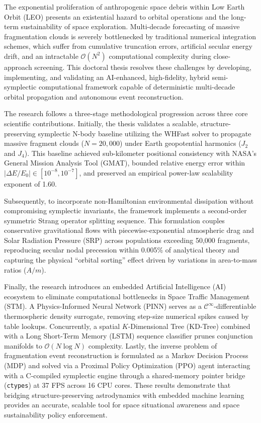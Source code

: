 \documentclass[12pt,letterpaper,twoside]{book}
\begin{document}
The exponential proliferation of anthropogenic space debris within Low Earth Orbit (LEO) presents an existential hazard to orbital operations and the long-term sustainability of space exploration. Multi-decade forecasting of massive fragmentation clouds is severely bottlenecked by traditional numerical integration schemes, which suffer from cumulative truncation errors, artificial secular energy drift, and an intractable $\mathcal{O}(N^2)$ computational complexity during close-approach screening. This doctoral thesis resolves these challenges by developing, implementing, and validating an AI-enhanced, high-fidelity, hybrid semi-symplectic computational framework capable of deterministic multi-decade orbital propagation and autonomous event reconstruction.

The research follows a three-stage methodological progression across three core scientific contributions. Initially, the thesis validates a scalable, structure-preserving symplectic N-body baseline utilizing the WHFast solver to propagate massive fragment clouds ($N = 20,000$) under Earth geopotential harmonics ($J_2$ and $J_4$). This baseline achieved sub-kilometer positional consistency with NASA's General Mission Analysis Tool (GMAT), bounded relative energy error within $|\Delta E/E_0| \in [10^{-8}, 10^{-7}]$, and preserved an empirical power-law scalability exponent of 1.60. 

Subsequently, to incorporate non-Hamiltonian environmental dissipation without compromising symplectic invariants, the framework implements a second-order symmetric Strang operator splitting sequence. This formulation couples conservative gravitational flows with piecewise-exponential atmospheric drag and Solar Radiation Pressure (SRP) across populations exceeding 50,000 fragments, reproducing secular nodal precession within 0.005\% of analytical theory and capturing the physical ``orbital sorting'' effect driven by variations in area-to-mass ratios ($A/m$).

Finally, the research introduces an embedded Artificial Intelligence (AI) ecosystem to eliminate computational bottlenecks in Space Traffic Management (STM). A Physics-Informed Neural Network (PINN) serves as a $\mathcal{C}^\infty$-differentiable thermospheric density surrogate, removing step-size numerical spikes caused by table lookups. Concurrently, a spatial $K$-Dimensional Tree (KD-Tree) combined with a Long Short-Term Memory (LSTM) sequence classifier prunes conjunction manifolds to $\mathcal{O}(N \log N)$ complexity. Lastly, the inverse problem of fragmentation event reconstruction is formulated as a Markov Decision Process (MDP) and solved via a Proximal Policy Optimization (PPO) agent interacting with a C-compiled symplectic engine through a shared-memory pointer bridge (\texttt{ctypes}) at 37 FPS across 16 CPU cores. These results demonstrate that bridging structure-preserving astrodynamics with embedded machine learning provides an accurate, scalable tool for space situational awareness and space sustainability policy enforcement.
\end{document}
